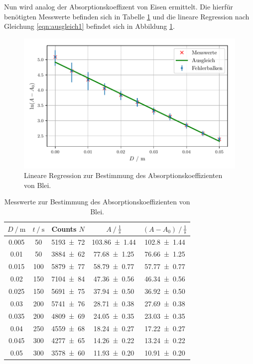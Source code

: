 \noindent Nun wird analog der Absorptionskoeffizent von Eisen ermittelt. Die hierfür benötigten Messwerte befinden sich in Tabelle \ref{tab:eisen}
und die lineare Regression nach Gleichung \eqref{eqn:ausgleich1} befindet sich in Abbildung \ref{fig:eisen}.
\begin{figure}[H]
  \center
  \includegraphics[scale = 0.75]{eisen.pdf}
  \caption{Lineare Regression zur Bestimmung des Absorptionskoeffizienten von Blei.}
  \label{fig:eisen}
\end{figure}
\begin{table}[H]
  \centering
  \caption{Messwerte zur Bestimmung des Absorptionskoeffizienten von Blei.}
  \label{tab:eisen}
  \begin{tabular}{c c c c c}
    \toprule
$D\:/\:\si{\meter}$ & $t\:/\:\si{\second}$ & Counts $N$ & $A\:/\:\frac{1}{\si{\second}}$ & $(A-A_0)\:/\:\frac{1}{\si{\second}}$ \\
    \midrule
    0.005 & 50  & \num{5193 +- 72} & \num{103.86 +- 1.44} & \num{102.8 +- 1.44} \\
    0.01  & 50  & \num{3884 +- 62} & \num{77.68 +- 1.25} & \num{76.66 +- 1.25} \\
    0.015 & 100 & \num{5879 +- 77} & \num{58.79 +- 0.77} & \num{57.77 +- 0.77} \\
    0.02  & 150 & \num{7104 +- 84} & \num{47.36 +- 0.56} & \num{46.34 +- 0.56} \\
    0.025 & 150 & \num{5691 +- 75} & \num{37.94 +- 0.50} & \num{36.92 +- 0.50} \\
    0.03  & 200 & \num{5741 +- 76} & \num{28.71 +- 0.38} & \num{27.69 +- 0.38} \\
    0.035 & 200 & \num{4809 +- 69} & \num{24.05 +- 0.35} & \num{23.03 +- 0.35} \\
    0.04  & 250 & \num{4559 +- 68} & \num{18.24 +- 0.27} & \num{17.22 +- 0.27} \\
    0.045 & 300 & \num{4277 +- 65} & \num{14.26  +- 0.22} & \num{13.24 +- 0.22} \\
    0.05  & 300 & \num{3578 +- 60} & \num{11.93 +- 0.20} & \num{10.91 +- 0.20} \\
    \bottomrule
  \end{tabular}
\end{table}


